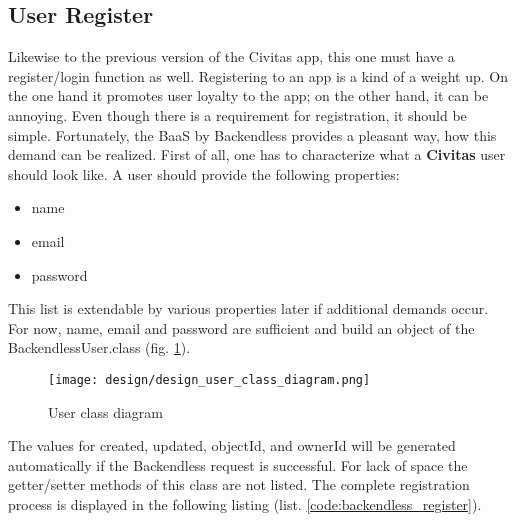 \subsection{User Register}
Likewise to the previous version of the Civitas app, this one must have a register/login function as well. Registering to an app is a kind of a weight up. On the one hand it promotes user loyalty to the app; on the other hand, it can be annoying. Even though there is a requirement for registration, it should be simple.
Fortunately, the BaaS by Backendless provides a pleasant way, how this demand can be realized. First of all, one has to characterize what a \textbf{Civitas} user should look like. A user should provide the following properties:
\begin{itemize}
\item name
\item email
\item password
\end{itemize}
This list is extendable by various properties later if additional demands occur. For now, name, email and password are sufficient and build an object of the BackendlessUser.class (fig. \ref{fig:design_user_class_diagram}). 

\begin{figure}[H]
	\centering \texttt{[image: design/design\_user\_class\_diagram.png]}
	\caption{User class diagram}
	\label{fig:design_user_class_diagram}
\end{figure}

The values for created, updated, objectId, and ownerId will be generated automatically if the Backendless request is successful. For lack of space the getter/setter methods of this class are not listed. The complete registration process is displayed in the following listing (list. \ref{code:backendless_register}).

\begin{mdframed}

\end{mdframed}

